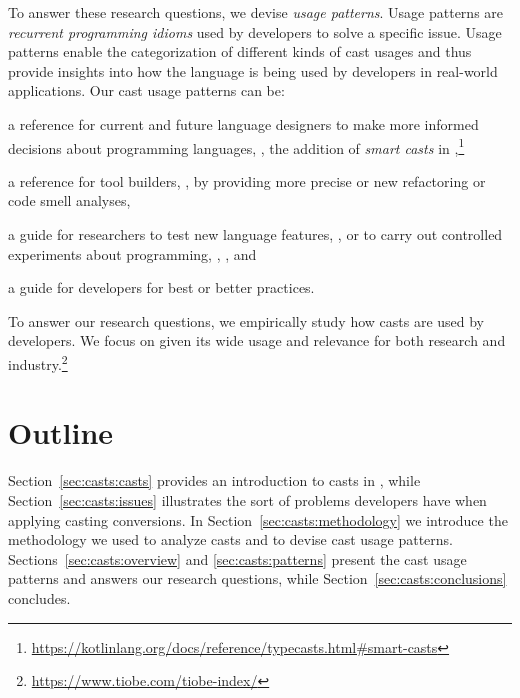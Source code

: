 To answer these research questions, we devise
\emph{usage patterns}.
Usage patterns are \emph{recurrent programming idioms} used by developers to solve a specific issue.
Usage patterns enable the categorization of different kinds of cast usages and
thus provide insights into how the language is being used by developers in real-world applications.
Our cast usage patterns can be:
\begin{inparaenum}[(1)]
\item a reference for current and future language designers
to make more informed decisions about programming languages,
\eg{},
the addition of \emph{smart casts} in ,\footnote{\url{https://kotlinlang.org/docs/reference/typecasts.html\#smart-casts}}
\item a reference for tool builders, \eg{}, by providing more precise or new
  refactoring or code smell analyses,
\item a guide for researchers to test new language features, \eg{}, \cite{wintherGuardedTypePromotion2011} or to carry out controlled
  experiments about programming, \eg{}, \cite{stuchlikStaticVsDynamic2011}, and
\item a guide for developers for best or better practices.
\end{inparaenum}
To answer our research questions,
we empirically study how casts
are used by developers.
We focus on \java{} given its wide usage and relevance for both
research and industry.\footnote{\url{https://www.tiobe.com/tiobe-index/}}

\section*{Outline}

Section~\ref{sec:casts:casts} provides an introduction to casts in \java{},
while Section~\ref{sec:casts:issues} illustrates the sort of problems developers have when applying casting conversions.
In Section~\ref{sec:casts:methodology} we introduce the methodology we used to analyze casts and to devise cast usage patterns.
Sections~\ref{sec:casts:overview} and \ref{sec:casts:patterns} present the cast usage patterns and answers our research questions,
while Section~\ref{sec:casts:conclusions} concludes.









